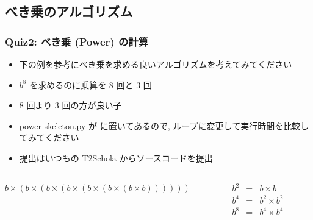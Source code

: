 \subsection{べき乗のアルゴリズム}
\begin{frame}
\frametitle{Quiz2: べき乗 (Power) の計算}
  \begin{itemize}
\item 下の例を参考にべき乗を求める良いアルゴリズムを考えてみてください
\item \(b^8\) を求めるのに乗算を 8 回と 3 回
\item  8 回より 3 回の方が良い子
\item power-skeleton.py が\href{https://sites.google.com/presystems.xyz/elementaryCS/}{} に置いてあるので,
ループに変更して実行時間を比較してみてください
\item 提出はいつもの T2Schola からソースコードを提出
  \end{itemize}
  \begin{example}[\(b^8\) の計算]
  \begin{columns}[t]
    \begin{column}{0.55\textwidth}
\(b\times(b\times(b\times(b\times(b\times(b\times(b\times b))))))\)
    \end{column}
    \begin{column}{0.35\textwidth}
\centering
      \begin{math}
        \begin{array}{rcl}
b^2 &=& b \times b\\
b^4 &=& b^2 \times b^2\\
b^8 &=& b^4 \times b^4
        \end{array}
      \end{math}
    \end{column}
  \end{columns}
  \end{example}
\end{frame}
